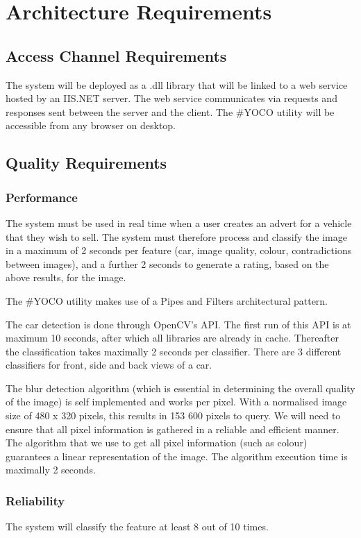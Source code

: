 \section{Architecture Requirements}
\subsection{Access Channel Requirements}
 
The system will be deployed as a .dll library that will be linked to a web service hosted by an IIS.NET server. The web service communicates via requests and responses sent between the server and the client. The \#YOCO utility will be accessible from any browser on desktop.
\subsection{Quality Requirements}

\subsubsection{Performance}
The system must be used in real time when a user creates an advert for a vehicle that they wish to sell. The system must therefore process and classify the image in a maximum of 2 seconds per feature (car, image quality, colour, contradictions between images), and a further 2 seconds to generate a rating, based on the above results, for the image.

The \#YOCO utility makes use of a Pipes and Filters architectural pattern.

The car detection is done through OpenCV's API. The first run of this API is at maximum 10 seconds, after which all libraries are already in cache. Thereafter the classification takes maximally 2 seconds per classifier. There are 3 different classifiers for front, side and back views of a car.

The blur detection algorithm (which is essential in determining the overall quality of the image) is self implemented and works per pixel. With a normalised image size of 480 x 320 pixels, this results in 153 600 pixels to query. We will need to ensure that all pixel information is gathered in a reliable and efficient manner. The algorithm that we use to get all pixel information (such as colour) guarantees a linear representation of the image. The algorithm execution time is maximally 2 seconds.

\subsubsection{Reliability}
The system will classify the feature at least 8 out of 10 times.

